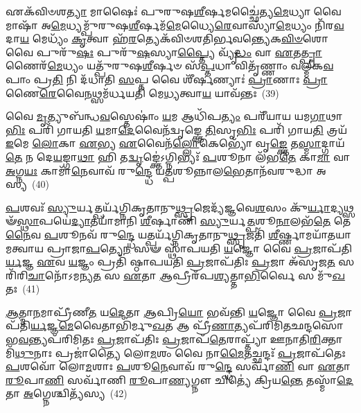 𑌏𑌕᳴𑌵𑌿𑍞𑌶\-\ul{𑌤𑍍𑌯𑌾} 𑌮𑌾𑌷𑍈𑌃॑ 𑌪𑍁𑌰𑍁𑌷\-\ul{𑌶𑍀}\-𑌰𑍍\mbox{}𑌷𑌮𑌚𑍍𑌛𑍈॑𑌤𑍍𑌯\-\ul{𑌮𑍇}\-𑌧𑍍𑌯𑌾 𑌵𑍈 𑌮𑌾𑌷𑌾᳴ 𑌅\-\ul{𑌮𑍇}\-𑌧𑍍𑌯𑌮𑍍𑌪𑍁᳴𑌰𑍁𑌷\-\ul{𑌶𑍀}\-𑌰𑍍\mbox{}𑌷𑌮᳴\-\ul{𑌮𑍇}\-𑌧𑍍𑌯𑍈\-\ul{𑌰𑍇}\-𑌵𑌾𑌸𑍍𑌯𑌾᳴\-\ul{𑌮𑍇}\-𑌧𑍍𑌯𑌂 𑌨𑌿᳴𑌰\-\ul{𑌵}\-𑌦𑌾\-\ul{𑌯} 𑌮𑍇𑌧𑍍𑌯𑌂᳴ \ul{𑌕𑍃}\-𑌤𑍍𑌵𑌾 𑌹᳴\-\ul{𑌰}\-𑌤𑍍𑌯𑍇𑌕᳴𑌵𑌿𑍞𑌶𑌤𑌿𑌰𑍍𑌭𑌵𑌨𑍍𑌤𑍍𑌯𑍇𑌕\-\ul{𑌵𑌿}\-\-\ul{𑍞}\-𑌶𑍋 𑌵𑍈 𑌪𑍁𑌰𑍁᳴\-\ul{𑌷𑌃} 𑌪𑍁𑌰𑍁᳴\-\ul{𑌷}\-𑌸𑍍𑌯𑌾\-\ul{𑌪𑍍𑌤𑍍𑌯𑍈} 𑌵𑍍𑌯𑍃᳴\-\ul{𑌦𑍍𑌧𑌂} 𑌵𑌾 \ul{𑌏}\-𑌤\-\ul{𑌤𑍍𑌪𑍍𑌰𑌾}\-𑌣𑍈𑌰᳴\-\ul{𑌮𑍇}\-𑌧𑍍𑌯𑌂 𑌯𑌤𑍍𑌪𑍁᳴𑌰𑍁𑌷\-\ul{𑌶𑍀}\-𑌰𑍍\mbox{}𑌷𑍞 𑌸᳴\-\ul{𑌪𑍍𑌤}\-𑌧𑌾 𑌵𑌿𑌤𑍃᳴𑌣𑍍𑌣𑌾𑌂 𑌵𑌲𑍍𑌮𑍀𑌕\-\ul{𑌵}\-𑌪𑌾𑌂 𑌪𑍍𑌰\-\ul{𑌤𑌿} 𑌨𑌿 𑌦᳴𑌧𑌾𑌤𑌿 \ul{𑌸}\-𑌪𑍍𑌤 𑌵𑍈 𑌶𑍀᳴𑌰𑍍\mbox{}\-\ul{𑌷}\-𑌣𑍍𑌯𑌾𑌃॑ \ul{𑌪𑍍𑌰𑌾}\-𑌣𑌾𑌃 \ul{𑌪𑍍𑌰𑌾}\-𑌣𑍈\-\ul{𑌰𑍇}\-𑌵𑍈\-\ul{𑌨}\-𑌥𑍍𑌸𑌮᳴𑌰𑍍𑌧𑌯𑌤𑌿 𑌮𑍇\-\ul{𑌧𑍍𑌯}\-𑌤𑍍𑌵𑌾\-\ul{𑌯} 𑌯𑌾𑌵᳴𑌨𑍍𑌤𑌃~(39)

𑌵𑍈 \ul{𑌮𑍃}\-𑌤𑍍𑌯𑍁𑌬᳴𑌨𑍍𑌧\-\ul{𑌵}\-𑌸𑍍𑌤𑍇𑌷𑌾𑌂॑ \ul{𑌯}\-𑌮 𑌆𑌧𑌿᳴𑌪\-\ul{𑌤𑍍𑌯𑌂} 𑌪𑌰𑍀᳴𑌯𑌾𑌯 𑌯𑌮\-\ul{𑌗𑌾}\-𑌥𑌾\-\ul{𑌭𑌿𑌃} 𑌪𑌰𑌿᳴ 𑌗𑌾𑌯𑌤𑌿 \ul{𑌯}\-𑌮𑌾\-\ul{𑌦𑍇}\-𑌵𑍈𑌨᳴𑌦𑍍𑌵𑍃𑌙𑍍𑌕𑍍𑌤𑍇 \ul{𑌤𑌿}\-𑌸𑍃\-\ul{𑌭𑌿𑌃} 𑌪𑌰𑌿᳴ 𑌗𑌾𑌯\-\ul{𑌤𑌿} 𑌤𑍍𑌰𑌯᳴ \ul{𑌇}\-𑌮𑍇 \ul{𑌲𑍋}\-𑌕𑌾 \ul{𑌏}\-𑌭𑍍𑌯 \ul{𑌏}\-𑌵𑍈𑌨᳴\-\ul{𑌲𑍍𑌲𑍋}\-𑌕𑍇𑌭𑍍𑌯𑍋᳴ 𑌵𑍃\-\ul{𑌙𑍍𑌕𑍍𑌤𑍇} 𑌤\-\ul{𑌸𑍍𑌮𑌾}\-𑌦𑍍𑌗𑌾𑌯᳴\-\ul{𑌤𑍇} 𑌨 𑌦𑍇\-\ul{𑌯}\-𑌙𑍍𑌗𑌾\-\ul{𑌥𑌾} 𑌹𑌿 𑌤\-\ul{𑌦𑍍𑌵𑍃}\-𑌙𑍍𑌕𑍍𑌤𑍇॑\-𑌽𑌗𑍍𑌨𑌿𑌭𑍍𑌯𑌃᳴ \ul{𑌪}\-𑌶𑍂𑌨𑌾 𑌲᳴𑌭\-\ul{𑌤𑍇} 𑌕𑌾\-\ul{𑌮𑌾} 𑌵𑌾 \ul{𑌅}\-𑌗𑍍𑌨\-\ul{𑌯𑌃} 𑌕𑌾𑌮𑌾᳴\-\ul{𑌨𑍇}\-𑌵𑌾𑌵᳴ 𑌰𑍁\-\ul{𑌨𑍍𑌦𑍍𑌧𑍇} 𑌯\-\ul{𑌤𑍍𑌪}\-𑌶𑍂𑌨𑍍𑌨𑌾𑌲\-\ul{𑌭𑍇}\-𑌤𑌾𑌨᳴𑌵𑌰𑍁𑌦𑍍𑌧𑌾 𑌅𑌸𑍍𑌯~(40)

\-\ul{𑌪}\-𑌶𑌵𑌃᳴ \ul{𑌸𑍍𑌯𑍁}\-𑌰𑍍𑌯𑌤𑍍𑌪𑌰𑍍𑌯᳴𑌗𑍍𑌨𑌿𑌕𑍃𑌤𑌾𑌨𑍁\-\ul{𑌥𑍍𑌸𑍃}\-𑌜𑍇𑌦𑍍𑌯᳴𑌜𑍍𑌞𑌵𑍇\-\ul{𑌶}\-𑌸𑌂 𑌕𑍁᳴\-\ul{𑌰𑍍𑌯𑌾}\-𑌦𑍍𑌯𑌥𑍍𑌸𑍟᳴\-\ul{𑌸𑍍𑌥𑌾}\-𑌪𑌯𑍇॑\-\ul{𑌦𑍍𑌯𑌾}\-𑌤𑌯𑌾᳴𑌮𑌾𑌨𑌿 \ul{𑌶𑍀}\-𑌰𑍍\mbox{}𑌷𑌾𑌣𑌿᳴ \ul{𑌸𑍍𑌯𑍁}\-𑌰𑍍𑌯\-\ul{𑌤𑍍𑌪}\-𑌶𑍂\-\ul{𑌨𑌾}\-𑌲𑌭᳴\-\ul{𑌤𑍇} 𑌤𑍇\-\ul{𑌨𑍈}\-𑌵 \ul{𑌪}\-𑌶𑍂𑌨𑌵᳴ 𑌰𑍁\-\ul{𑌨𑍍𑌦𑍍𑌧𑍇} 𑌯𑌤𑍍𑌪𑌰𑍍𑌯᳴𑌗𑍍𑌨𑌿𑌕𑍃𑌤𑌾𑌨𑍁\-\ul{𑌥𑍍𑌸𑍃}\-𑌜𑌤𑌿᳴ \ul{𑌶𑍀}\-𑌰𑍍𑌷𑍍𑌣𑌾𑌮𑌯𑌾᳴𑌤𑌯𑌾𑌮𑌤𑍍𑌵𑌾𑌯 𑌪𑍍𑌰𑌾𑌜𑌾\-\ul{𑌪}\-𑌤𑍍𑌯𑍇\-\ul{𑌨} 𑌸𑍟 𑌸𑍍𑌥𑌾᳴𑌪𑌯𑌤𑌿 \ul{𑌯}\-𑌜𑍍𑌞𑍋 𑌵𑍈 \ul{𑌪𑍍𑌰}\-𑌜𑌾𑌪᳴𑌤𑌿\-\ul{𑌰𑍍𑌯}\-𑌜𑍍𑌞 \ul{𑌏}\-𑌵 \ul{𑌯}\-𑌜𑍍𑌞𑌂 𑌪𑍍𑌰𑌤𑌿᳴ 𑌷𑍍𑌠𑌾𑌪𑌯𑌤𑌿 \ul{𑌪𑍍𑌰}\-𑌜𑌾𑌪᳴𑌤𑌿𑌃 \ul{𑌪𑍍𑌰}\-𑌜𑌾 𑌅᳴𑌸𑍃𑌜\-\ul{𑌤} 𑌸 𑌰𑌿᳴𑌰𑌿\-\ul{𑌚𑌾}\-𑌨𑍋᳴\-𑌽𑌮𑌨𑍍𑌯\-\ul{𑌤} 𑌸 \ul{𑌏}\-𑌤𑌾 \ul{𑌆}\-𑌪𑍍𑌰𑍀𑌰᳴𑌪\-\ul{𑌶𑍍𑌯}\-𑌤𑍍𑌤𑌾\-\ul{𑌭𑌿}\-𑌰𑍍𑌵𑍈 𑌸 𑌮𑍁᳴\-\ul{𑌖}\-𑌤𑌃~(41)

\-\ul{𑌆}\-𑌤𑍍𑌮𑌾\-\ul{𑌨}\-𑌮𑌾𑌪𑍍𑌰𑍀᳴𑌣𑍀\-\ul{𑌤} 𑌯\-\ul{𑌦𑍇}\-𑌤𑌾 \ul{𑌆}\-𑌪𑍍𑌰𑌿\-\ul{𑌯𑍋} 𑌭𑌵᳴𑌨𑍍𑌤𑌿 \ul{𑌯}\-𑌜𑍍𑌞𑍋 𑌵𑍈 \ul{𑌪𑍍𑌰}\-𑌜𑌾𑌪᳴𑌤𑌿\-\ul{𑌰𑍍𑌯}\-𑌜𑍍𑌞\-\ul{𑌮𑍇}\-𑌵𑍈𑌤𑌾𑌭𑌿᳴𑌰𑍍𑌮𑍁\-\ul{𑌖}\-𑌤 𑌆 𑌪𑍍𑌰𑍀᳴\-\ul{𑌣𑌾}\-𑌤𑍍𑌯𑌪᳴𑌰𑌿𑌮𑌿𑌤𑌛𑌨𑍍𑌦𑌸𑍋 𑌭\-\ul{𑌵}\-𑌨𑍍𑌤𑍍𑌯𑌪᳴𑌰𑌿𑌮𑌿𑌤𑌃 \ul{𑌪𑍍𑌰}\-𑌜𑌾𑌪᳴𑌤𑌿𑌃 \ul{𑌪𑍍𑌰}\-𑌜𑌾𑌪᳴\-\ul{𑌤𑍇}\-𑌰𑌾𑌪𑍍𑌤𑍍𑌯𑌾᳴ 𑌊𑌨𑌾𑌤𑌿\-\ul{𑌰𑌿}\-𑌕𑍍𑌤𑌾 𑌮𑌿᳴\-\ul{𑌥𑍁}\-𑌨𑌾𑌃 𑌪𑍍𑌰𑌜𑌾॑𑌤𑍍𑌯𑍈 𑌲𑍋\-\ul{𑌮}\-𑌶𑌂 𑌵𑍈 𑌨𑌾\-\ul{𑌮𑍈}\-𑌤𑌚𑍍𑌛𑌨𑍍𑌦𑌃᳴ \ul{𑌪𑍍𑌰}\-𑌜𑌾𑌪᳴𑌤𑍇𑌃 \ul{𑌪}\-𑌶𑌵𑍋᳴ 𑌲𑍋\-\ul{𑌮}\-𑌶𑌾𑌃 \ul{𑌪}\-𑌶𑍂\-\ul{𑌨𑍇}\-𑌵𑌾𑌵᳴ 𑌰𑍁\-\ul{𑌨𑍍𑌦𑍍𑌧𑍇} 𑌸𑌰𑍍𑌵𑌾᳴\-\ul{𑌣𑌿} 𑌵𑌾 \ul{𑌏}\-𑌤𑌾 \ul{𑌰𑍂}\-𑌪𑌾\-\ul{𑌣𑌿} 𑌸𑌰𑍍𑌵𑌾᳴𑌣𑌿 \ul{𑌰𑍂}\-𑌪𑌾\-\ul{𑌣𑍍𑌯}\-𑌗𑍍𑌨𑍗 𑌚𑌿𑌤𑍍𑌯𑍇॑ 𑌕𑍍𑌰𑌿𑌯\-\ul{𑌨𑍍𑌤𑍇} 𑌤𑌸𑍍𑌮𑌾᳴\-\ul{𑌦𑍇}\-𑌤𑌾 \ul{𑌅}\-𑌗𑍍𑌨𑍇𑌶𑍍𑌚𑌿𑌤𑍍𑌯᳴𑌸𑍍𑌯~(42)


